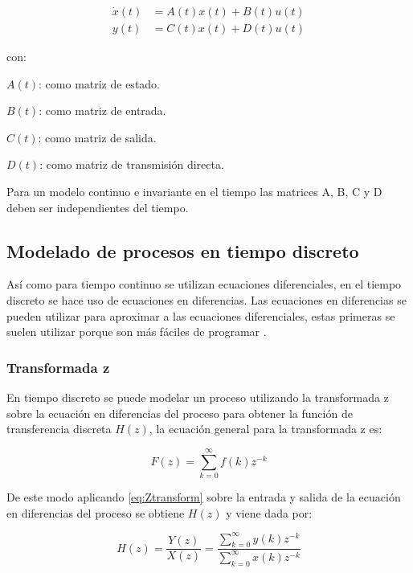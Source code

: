 			\begin{align}\label{eq:SSrepresentation}
				\dot{x}(t) &= A(t)x(t) + B(t)u(t) \\
				y(t) &= C(t)x(t) + D(t)u(t)
			\end{align}
			
			\begin{spacing}{1.5}
				con: 
				
				$A(t)$: como matriz de estado.
				
				$B(t)$: como matriz de entrada.
				
				$C(t)$: como matriz de salida.
				
				$D(t)$: como matriz de transmisión directa.
				
			\end{spacing}
			
			Para un modelo continuo e invariante en el tiempo las matrices A, B, C y D deben ser independientes del tiempo.
			
	\subsection{Modelado de procesos en tiempo discreto}
	
		Así como para tiempo continuo se utilizan ecuaciones diferenciales, en el tiempo discreto se hace uso de ecuaciones en diferencias. Las ecuaciones en diferencias se pueden utilizar para aproximar a las ecuaciones diferenciales, estas primeras se suelen utilizar porque son más fáciles de programar \Parencite{kuo1996sistemas}.
	
		\subsubsection{Transformada z}
		
			En tiempo discreto se puede modelar un proceso utilizando la transformada z sobre la ecuación en diferencias del proceso para obtener la función de transferencia discreta $H(z)$, la ecuación general para la transformada z es:
			
			\begin{equation}\label{eq:Ztransform}
				F(z)= \sum\limits_{k=0}^{\infty}f(k)z^{-k}
			\end{equation}
			
			De este modo aplicando \cref{eq:Ztransform} sobre la entrada y salida de la ecuación en diferencias del proceso se obtiene $H(z)$ y viene dada por:
			
			\begin{equation}\label{eq:ZTransfer}
				H(z) =	\frac{Y(z)}{X(z)} = \frac{\displaystyle\sum\limits_{k=0}^{\infty}y(k)z^{-k}}{\displaystyle\sum\limits_{k=0}^{\infty}x(k)z^{-k}}
			\end{equation}
		
